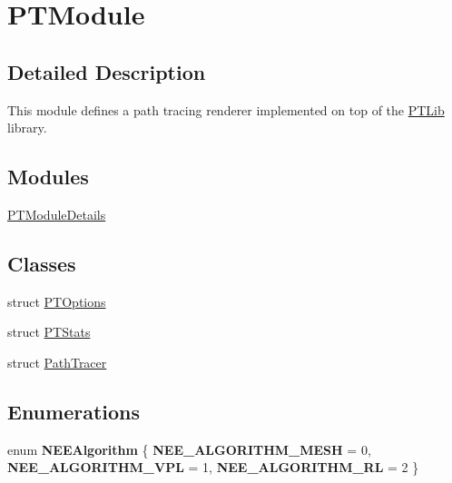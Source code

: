 \hypertarget{group___p_t_module}{}\section{P\+T\+Module}
\label{group___p_t_module}


\subsection{Detailed Description}
This module defines a path tracing renderer implemented on top of the \hyperlink{group___p_t_lib}{P\+T\+Lib} library. \subsection*{Modules}
\begin{DoxyCompactItemize}
\item 
\hyperlink{group___p_t_module_details}{P\+T\+Module\+Details}
\end{DoxyCompactItemize}
\subsection*{Classes}
\begin{DoxyCompactItemize}
\item 
struct \hyperlink{struct_p_t_options}{P\+T\+Options}
\item 
struct \hyperlink{struct_p_t_stats}{P\+T\+Stats}
\item 
struct \hyperlink{struct_path_tracer}{Path\+Tracer}
\end{DoxyCompactItemize}
\subsection*{Enumerations}
\begin{DoxyCompactItemize}
\item 
\mbox{\label{group___p_t_module_ga3c16dc3c73977137e6aad189c4ef5a6a}} 
enum {\bfseries N\+E\+E\+Algorithm} \{ {\bfseries N\+E\+E\+\_\+\+A\+L\+G\+O\+R\+I\+T\+H\+M\+\_\+\+M\+E\+SH} = 0, 
{\bfseries N\+E\+E\+\_\+\+A\+L\+G\+O\+R\+I\+T\+H\+M\+\_\+\+V\+PL} = 1, 
{\bfseries N\+E\+E\+\_\+\+A\+L\+G\+O\+R\+I\+T\+H\+M\+\_\+\+RL} = 2
 \}
\end{DoxyCompactItemize}
